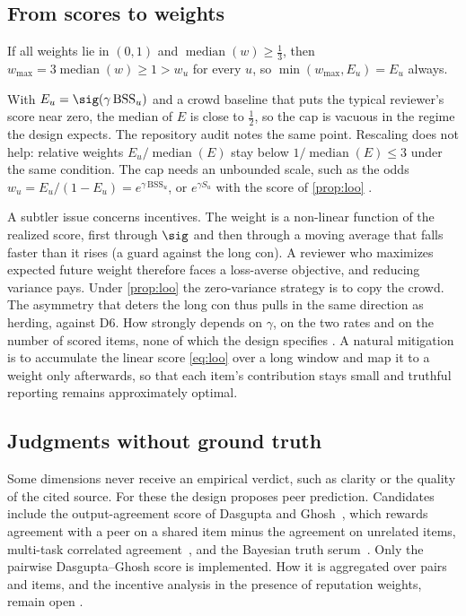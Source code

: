 \subsection{From scores to weights}

\begin{proposition}\label{prop:cap}\proved{}
If all weights lie in $(0,1)$ and $\operatorname{median}(w)\ge\tfrac13$, then
$w_{\max}=3\operatorname{median}(w)\ge1>w_u$ for every $u$, so $\min(w_{\max},E_u)=E_u$ always.
\end{proposition}

With $E_u=\sig(\gamma\,\mathrm{BSS}_u)$ and a crowd baseline that puts the typical reviewer's
score near zero, the median of $E$ is close to $\tfrac12$, so the cap is vacuous in the regime the
design expects. The repository audit notes the same point. Rescaling does not help:
relative weights $E_u/\operatorname{median}(E)$ stay below $1/\operatorname{median}(E)\le3$ under
the same condition. The cap needs an unbounded scale, such as the odds
$w_u=E_u/(1-E_u)=e^{\gamma\,\mathrm{BSS}_u}$, or $e^{\gamma S_u}$ with the score of
\cref{prop:loo} \openq.

A subtler issue concerns incentives. The weight is a non-linear function of the realized score,
first through $\sig$ and then through a moving average that falls faster than it rises (a guard
against the long con). A reviewer who maximizes expected future weight therefore faces a
loss-averse objective, and reducing variance pays. Under \cref{prop:loo} the zero-variance
strategy is to copy the crowd. The asymmetry that deters the long con thus pulls in the same
direction as herding, against D6. How strongly depends on $\gamma$, on the two rates and on the
number of scored items, none of which the design specifies \openq. A natural mitigation is to
accumulate the linear score \eqref{eq:loo} over a long window and map it to a weight only
afterwards, so that each item's contribution stays small and truthful reporting remains
approximately optimal.

\subsection{Judgments without ground truth}

Some dimensions never receive an empirical verdict, such as clarity or the quality of the cited
source. For these the design proposes peer prediction. Candidates include the output-agreement
score of Dasgupta and Ghosh~\cite{dasgupta2013crowdsourced}, which rewards agreement with a peer
on a shared item minus the agreement on unrelated items, multi-task correlated
agreement~\cite{shnayder2016informed}, and the Bayesian truth serum~\cite{prelec2004bts}. Only the
pairwise Dasgupta--Ghosh score is implemented. How it is aggregated over pairs and items, and the
incentive analysis in the presence of reputation weights, remain open \openq.
